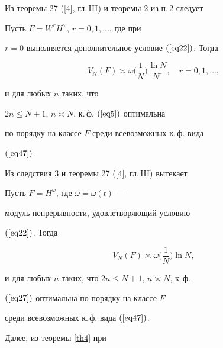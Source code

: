 Из теоремы 27 ([4], гл.\,III) и теоремы 2 из п.\,2 следует








\begin{thm}\label{th5}


Пусть $F = W^rH^\omega$, $r=0,1,\dotsc$, где при


$r=0$ выполняется дополнительное условие $(\ref{eq22})$. Тогда


$$


V_N(F)\asymp\omega\bigg(\frac{1}{N}\bigg)\frac{\ln


N}{N^r}, \quad r=0,1,\dotsc,


$$


и для любых $n$ таких, что


$2n\leq N+1$, $n\asymp N$, к.\,ф. $(\ref{eq5})$ оптимальна


по порядку на классе $F$ среди всевозможных к.\,ф. вида


$(\ref{eq47})$.


\end{thm}








Из следствия 3 и теоремы 27 ([4], гл.\,III) вытекает








\begin{thm}\label{th6}


Пусть $F=H^\omega$, где $\omega=\omega(t)$ ---


модуль непрерывности, удовлетворяющий условию


$(\ref{eq22})$. Тогда


$$


V_N(F)\asymp\omega\bigg(\frac{1}{N}\bigg)\ln N,


$$


и для любых $n$ таких, что $2n\leq N+1$, $n\asymp N$, к.\,ф.


$(\ref{eq27})$ оптимальна по порядку на классе $F$


среди всевозможных к.\,ф. вида $(\ref{eq47})$.


\end{thm}








Далее, из теоремы \ref{th4} при


